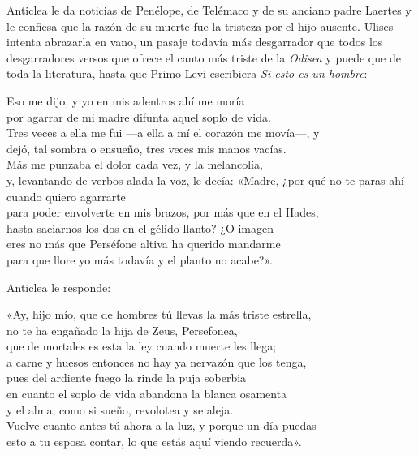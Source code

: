 Anticlea le da noticias de Penélope, de Telémaco y de su anciano padre Laertes y le confiesa que la razón de su muerte fue la tristeza por el hijo ausente. Ulises intenta abrazarla en vano, un pasaje todavía más desgarrador que todos los desgarradores versos que ofrece el canto más triste de la \emph{Odisea} y puede que de toda la literatura, hasta que Primo Levi escribiera \emph{Si esto es un hombre}:

\begin{versocita}
Eso me dijo, y yo en mis adentros ahí me moría\\
por agarrar de mi madre difunta aquel soplo de vida.\\
Tres veces a ella me fui ---a ella a mí el corazón me movía---, y\\
dejó, tal sombra o ensueño, tres veces mis manos vacías.\\
Más me punzaba el dolor cada vez, y la melancolía,\\
y, levantando de verbos alada la voz, le decía:
\stanzabreak
«Madre, ¿por qué no te paras ahí cuando quiero agarrarte\\
para poder envolverte en mis brazos, por más que en el Hades,\\
hasta saciarnos los dos en el gélido llanto? ¿O imagen\\
eres no más que Perséfone altiva ha querido mandarme\\
para que llore yo más todavía y el planto no acabe?».
\end{versocita}

Anticlea le responde:

\begin{versocita}
«Ay, hijo mío, que de hombres tú llevas la más triste estrella,\\
no te ha engañado la hija de Zeus, Persefonea,\\
que de mortales es esta la ley cuando muerte les llega;\\
a carne y huesos entonces no hay ya nervazón que los tenga,\\
pues del ardiente fuego la rinde la puja soberbia\\
en cuanto el soplo de vida abandona la blanca osamenta\\
y el alma, como si sueño, revolotea y se aleja.\\
Vuelve cuanto antes tú ahora a la luz, y porque un día puedas\\
esto a tu esposa contar, lo que estás aquí viendo recuerda».
\end{versocita}

